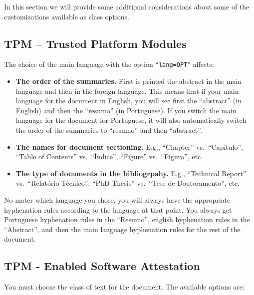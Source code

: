 In this section we will provide some additional considerations about some of the customizations available as class options.

\subsection{TPM – Trusted Platform Modules } %
\label{ssec:trusted_platform_modules}

The choice of the main language with the option “\texttt{lang=OPT}” affects:

\begin{itemize}
	\item \textbf{The order of the summaries.} First is printed the abstract in the main language and then in the foreign language. This means that if your main language for the document in English, you will see first the “abstract” (in English) and then the “resumo” (in Portuguese). If you switch the main language for the document for Portuguese, it will also automatically switch the order of the summaries to “resumo” and then “abstract”.
	\item \textbf{The names for document sectioning.} E.g., ``Chapter'' vs.\ ``Capítulo'', ``Table of Contents'' vs.\ ``Índice'', ``Figure'' vs.\ ``Figura'', etc.
	\item \textbf{The type of documents in the bibliogrpahy.} E.g., ``Technical Report'' vs.\ ``Relatório Técnico'', ``PhD Thesis'' vs.\ ``Tese de Doutoramento'', etc.
\end{itemize} 

No mater which language you chose, you will always have the appropriate hyphenation rules according to the language at that point. You always get Portuguese hyphenation rules in the ``Resumo'', english hyphenation rules in the ``Abstract'', and then the main language hyphenation rules for the rest of the document.




\subsection{TPM - Enabled Software Attestation} %
\label{ssec:enabled _software_attestation}

You must choose the class of text for the document. The available options are:

